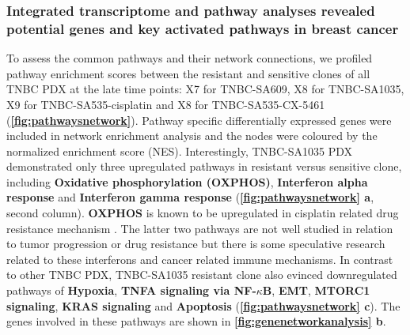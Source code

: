 
\subsubsection{Integrated transcriptome and pathway analyses revealed potential genes and key activated pathways in breast cancer}
To assess the common pathways and their network connections, 
we profiled pathway enrichment scores between the resistant and sensitive clones of all TNBC PDX at the late time points:  X7 for TNBC-SA609, X8 for TNBC-SA1035, X9 for TNBC-SA535-cisplatin and X8 for TNBC-SA535-CX-5461 (\textbf{\autoref{fig:pathwaysnetwork}}). 
Pathway specific differentially expressed genes were included in network enrichment analysis and the nodes were coloured by the normalized enrichment score (NES). Interestingly, TNBC-SA1035 PDX demonstrated only three upregulated pathways in resistant versus sensitive clone, including \textbf{Oxidative phosphorylation (OXPHOS)}, \textbf{Interferon alpha response} \cite{provance2019deciphering} and \textbf{Interferon gamma response} \cite{mojic2018dark} (\textbf{\autoref{fig:pathwaysnetwork} a}, second column). \textbf{\ac{OXPHOS}} is known to be upregulated in cisplatin related drug resistance mechanism \cite{lee2017myc}. The latter two pathways are not well studied in relation to tumor progression or drug resistance but there is some speculative research related to these interferons and cancer related immune mechanisms. In contrast to other TNBC PDX, TNBC-SA1035 resistant clone also evinced downregulated pathways of \textbf{Hypoxia}, \textbf{TNFA signaling via NF-$\kappa$B}, \textbf{\ac{EMT}}, \textbf{MTORC1 signaling}, \textbf{KRAS signaling} and \textbf{Apoptosis} ({\textbf{\autoref{fig:pathwaysnetwork} c}}). The genes involved in these pathways are shown in \textbf{\autoref{fig:genenetworkanalysis} b}.

